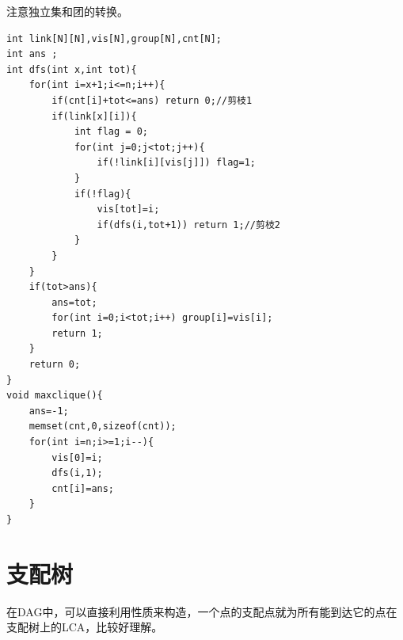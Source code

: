 \documentclass[a4paper,11pt,twoside,fontset = fandol,UTF8]{ctexbook} %
\begin{document}
	注意独立集和团的转换。
	\begin{lstlisting}
int link[N][N],vis[N],group[N],cnt[N];
int ans ;
int dfs(int x,int tot){
    for(int i=x+1;i<=n;i++){
        if(cnt[i]+tot<=ans) return 0;//剪枝1 
        if(link[x][i]){
            int flag = 0;
            for(int j=0;j<tot;j++){
                if(!link[i][vis[j]]) flag=1;
            }
            if(!flag){
                vis[tot]=i;
                if(dfs(i,tot+1)) return 1;//剪枝2 
            }
        }
    }
    if(tot>ans){
        ans=tot;
        for(int i=0;i<tot;i++) group[i]=vis[i];
        return 1;
    }
    return 0;
}
void maxclique(){
    ans=-1;
    memset(cnt,0,sizeof(cnt));
    for(int i=n;i>=1;i--){
        vis[0]=i;
        dfs(i,1);
        cnt[i]=ans;
    }
}
	\end{lstlisting}
	\section{支配树}
	在DAG中，可以直接利用性质来构造，一个点的支配点就为所有能到达它的点在支配树上的LCA，比较好理解。
	
\end{document}
